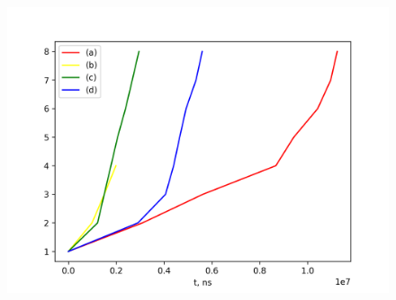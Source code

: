 \documentclass[14pt, a4paper]{article}
\begin{document}
\begin{enumerate}
\begin{figure}[h]
\centering
\includegraphics[scale=0.6]{infalaba1_5_2.png}
\label{image5_2}
\end{figure}

\end{enumerate}
\end{document}

